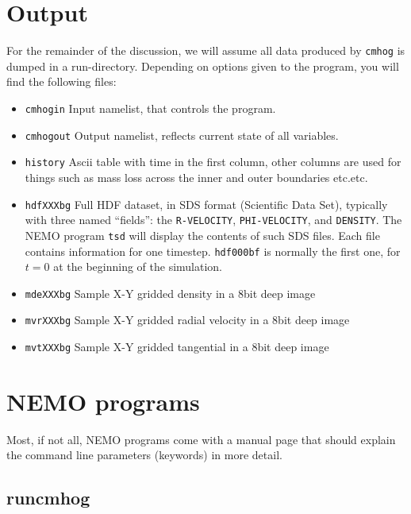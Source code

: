 \documentclass[11pt]{article}
\begin{document}
\section{Output}

For the remainder of the discussion, we will assume all data produced
by {\tt cmhog} is dumped in a run-directory. 
Depending on options given to the program, you will find the following files:

\begin{itemize}

\item
{\tt cmhogin}
Input namelist, that controls the program.

\item
{\tt cmhogout}
Output namelist, reflects current state of all variables.

\item
{\tt history}
Ascii table with time in the first column, other columns 
are used for things such as mass loss across the inner and 
outer boundaries etc.etc.

\item
{\tt hdfXXXbg}
Full HDF dataset, in SDS format (Scientific Data Set), typically
with three named ``fields'': the 
{\tt R-VELOCITY}, {\tt PHI-VELOCITY}, and {\tt DENSITY}.
The NEMO program {\tt tsd} will display the contents of
such SDS files. Each file contains information for one timestep.
{\tt hdf000bf} is normally the first one, for $t=0$ at the beginning
of the simulation.

\item
{\tt mdeXXXbg}
Sample X-Y gridded density in a 8bit deep image

\item
{\tt mvrXXXbg}
Sample X-Y gridded radial velocity in a 8bit deep image

\item
{\tt mvtXXXbg}
Sample X-Y gridded tangential in a 8bit deep image

\end{itemize}

\section{NEMO programs}

Most, if not all, NEMO programs come with a manual page that should
explain the command line parameters (keywords) in more detail.

\subsection{runcmhog}
\end{document}
